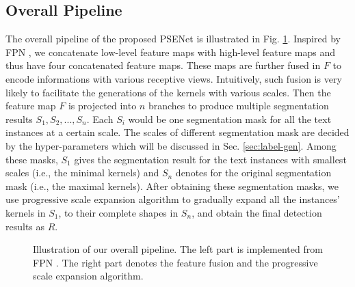 \documentclass{article}
\begin{document}
\subsection{Overall Pipeline}
The overall pipeline of the proposed PSENet is illustrated in Fig. \ref{fig:pipeline}. 
Inspired by FPN \cite{lin2017feature}, we concatenate low-level feature maps with high-level feature maps and thus have four concatenated feature maps. These maps are further fused in $F$ to encode informations with various receptive views. Intuitively, such fusion is very likely to facilitate the generations of the kernels with various scales. Then the feature map $F$ is projected into $n$ branches to produce multiple segmentation results $S_1, S_2, ..., S_n$. Each $S_i$ would be one segmentation mask for all the text instances at a certain scale. The scales of different segmentation mask are decided by the hyper-parameters which will be discussed in Sec. \ref{sec:label-gen}.
Among these masks, $S_1$ gives the segmentation result for the text instances with smallest scales (i.e., the minimal kernels) and $S_n$ denotes for the original segmentation mask (i.e., the maximal kernels). After obtaining these segmentation masks, we use progressive scale expansion algorithm to gradually expand all the instances' kernels in $S_1$, to their complete shapes in $S_n$, and obtain the final detection results as $R$.




\begin{figure}
  \centering
  \setlength{\fboxrule}{0pt}
  \vspace{-14pt}
  \caption{Illustration of our overall pipeline. The left part is implemented from FPN \cite{lin2017feature}. The right part denotes the feature fusion and the progressive scale expansion algorithm.}
  \label{fig:pipeline}
  \vspace{-6pt}
\end{figure}
\end{document}
